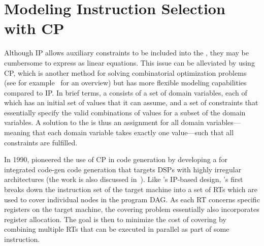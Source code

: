 \section{Modeling Instruction Selection with CP}

Although \glsdesc{IP} allows auxiliary constraints to be included into the
\tIPmodel, they may be cumbersome to express as linear equations.
%
This issue can
be alleviated by using \gls{CP}, which is another method for solving
combinatorial optimization problems (see for example~\cite{Rossi2006} for an
overview) but has more flexible modeling capabilities compared to \gls{IP}.
%
In
brief terms, a \tCPmodel consists of a set of \glspl{domain variable}, each of
which has an initial set of values that it can assume, and a set of constraints
that essentially specify the valid combinations of values for a subset of the
\glspl{domain variable}.
%
A solution to the \tCPmodel is thus an assignment for
all \glspl{domain variable}---meaning that each \gls{domain variable} takes
exactly one value---such that all constraints are fulfilled.

In 1990, \textcite{Bashford1999} pioneered the use of \glsdesc{CP} in \gls{code
  generation} by developing a \tCPmodel for \gls{integrated code-gen} \gls{code
  generation} that targets \glspl{DSP} with highly irregular architectures (the
work is also discussed in~\cite{Leupers2000b, Leupers2000c}).
%
Like
\citeauthor{Leupers1996}'s \gls{IP}-based design, \citeauthor{Bashford1999}'s
first breaks down the \gls{instruction set} of the \gls{target machine} into a
set of \glspl{RT} which are used to cover individual \glspl{node} in the
\gls{program DAG}.
%
As each \gls{RT} concerns specific \glspl{register} on the
\gls{target machine}, the covering problem essentially also incorporates
\gls{register allocation}.
%
The goal is then to minimize the cost of covering by
combining multiple \glspl{RT} that can be executed in parallel as part of some
\gls{instruction}.

